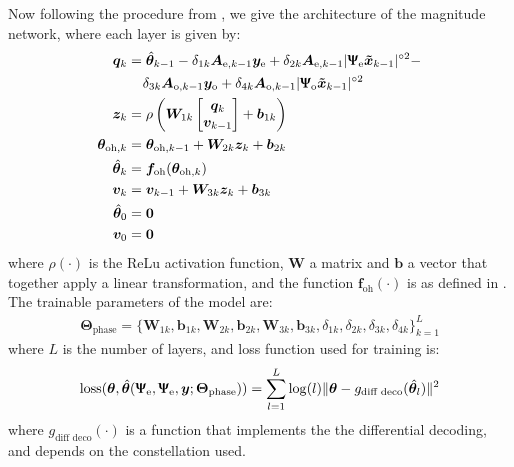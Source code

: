 Now following the procedure from \cite{Neev_2019}, we give the architecture of the magnitude network, where each layer is given by:
\begin{align}
	\bm q_k& = \hat{\bm{\theta}}_{k-1} -\delta_{1k}\bm A_{\text{e},k-1}\bm y_\text{e} +\delta_{2k}\bm A_{\text{e},k-1}|\bm{\bm{\Uppsi}_\text{e}\tilde{x}}_{k-1}|^{\circ2}-\nonumber\\
	&\;\;\;\;\delta_{3k}\bm A_{\text{o},k-1}\bm y_\text{o} +\delta_{4k}\bm A_{\text{o},k-1}|\bm{\bm{\Uppsi}_\text{o}\tilde{x}}_{k-1}|^{\circ2}\\
	\bm z_k&=\rho\left( \bm W_{1k}\begin{bmatrix}\bm q_k\\\bm v_{k-1}\end{bmatrix}+\bm b_{1k}\right)\\
	\bm{\theta}_{\text{oh},k} &= \bm{\theta}_{\text{oh},k-1}+\bm W_{2k}\bm z_k+\bm b_{2k}\\
	\hat{\bm{\theta}}_{k} &= \bm f_{\text{oh}}(\bm{\theta}_{\text{oh},k})\\
	\bm v_k&=\bm v_{k-1}+\bm W_{3k}\bm z_k+\bm b_{3k}\\
	\hat{\bm{\theta}}_{0} &= \bm 0\\
	\bm v_0&=\bm 0\\
\end{align}
where $\rho(\cdot)$ is the ReLu activation function, $\bm W$ a matrix and $\bm b$ a vector that together apply a linear transformation, and  the function $\bm f_{\text{oh}}(\cdot)$ is as defined in \cite{Neev_2019}.\\

The trainable parameters of the model are:
\begin{align}
	\bm \Theta_\text{phase} = \bigl\{\bm W_{1k},\bm b_{1k},\bm W_{2k},\bm b_{2k},\bm W_{3k},\bm b_{3k},\delta_{1k},\delta_{2k},\delta_{3k},\delta_{4k}  \bigr\}_{k=1}^L
\end{align}
where $L$ is the number of layers, and loss function used for training is:
\begin{align}
	\text{loss}(\bm \theta, \hat{\bm \theta}(\bm{\Uppsi}_\text{e},\bm{\Uppsi}_\text{e},\bm y;\bm \Theta_\text{phase}))=\sum_{l=1}^L\log(l)\lVert \bm \theta-g_\text{diff deco}(\hat{\bm{\theta}}_{l})\rVert^2
\end{align}
where $g_\text{diff deco}(\cdot)$ is a function that implements the the differential decoding, and depends on the constellation used.





